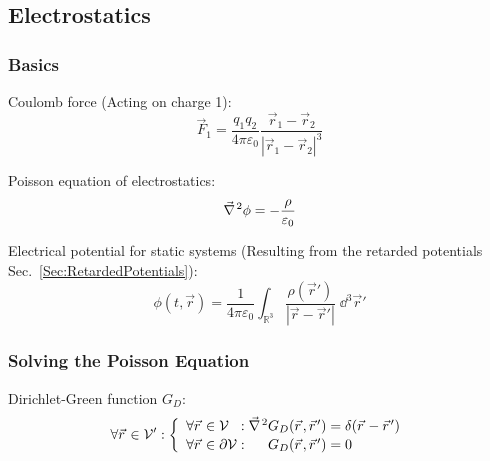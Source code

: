 	\subsection{Electrostatics}
		\subsubsection{Basics}
			\noindent
			Coulomb force (Acting on charge 1):
			\begin{equation}
				\vec{F}_1 = \frac{q_1 q_2}{4\pi\varepsilon_0}\frac{\vec{r}_1-\vec{r}_2}{\left|\vec{r}_1-\vec{r}_2\right|^3}
			\end{equation}

			\noindent
			Poisson equation of electrostatics:
			\begin{equation}
				\Nabla^2\phi = -\frac{\rho}{\varepsilon_0}
				\label{Eq:Poisson}
			\end{equation}

			\noindent
			Electrical potential for static systems (Resulting from the retarded potentials Sec.~\ref{Sec:RetardedPotentials}):
			\begin{equation}
				\phi\left(t,\vec{r}\right)
				= \frac{1}{4\pi\varepsilon_0} \int_{\mathbb{R}^3} \frac{\rho(\vec{r}')}{\left|\vec{r}-\vec{r}'\right|}\;\dd^3 \vec{r}'
			\end{equation}

		\subsubsection{Solving the Poisson Equation}
			\noindent
			Dirichlet-Green function $G_D$:
			\begin{equation}
				\forall\vec{r}\in\mathcal{V}': \left\{\begin{array}{ll}
					\forall\vec{r}\in\mathcal{V}\phantom\partial:
					\Nabla^2 G_D(\vec{r},\vec{r}') = \delta(\vec{r}-\vec{r}') \\
					\forall\vec{r}\in\partial\mathcal{V}:
					\phantom{\Nabla^2}G_D(\vec{r},\vec{r}') = 0
				\end{array}\right.
			\end{equation}

